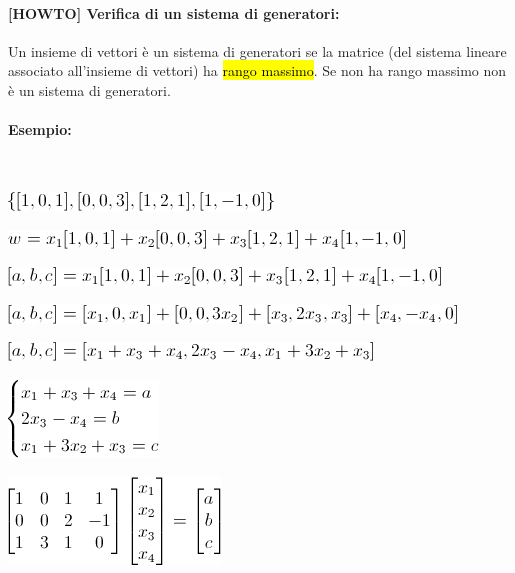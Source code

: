 \documentclass[a4paper]{article}
\begin{document}
        \paragraph{[HOWTO] Verifica di un sistema di generatori:}
        Un insieme di vettori \`{e} un sistema di generatori se la matrice (del sistema lineare associato all'insieme di vettori) ha \hl{rango massimo}.
        Se non ha rango massimo non \`{e} un sistema di generatori.

        \paragraph{Esempio:} ~\newline
        \begin{spacing}{1.7}
                \includegraphics[scale=0.7]{55d6c70de6a2b6f5bfca5714bc322c0b}

                \includegraphics[scale=0.7]{b4b208240e420e9a59d7aee365987cea}

                \includegraphics[scale=0.7]{c7f8c113a7a64f52390513751b40be1b}

                \includegraphics[scale=0.7]{8f6dcaecd7117937887835655f8e3955}

                \includegraphics[scale=0.7]{34d0dd99a1b48b90aeb41fce06e193eb}

                \includegraphics[scale=0.7]{624323dc4ef4c3a17e8e3b8e6fd97eda}

                \includegraphics[scale=0.7]{7036093dfd160277402386a0104bb0b4}
        \end{spacing}
\end{document}
